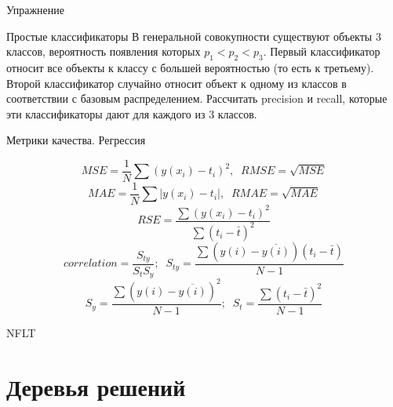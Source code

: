 \documentclass[10pt]{beamer}
\begin{document}

\begin{frame}{Упражнение}

\begin{exampleblock}{Простые классификаторы}
В генеральной совокупности существуют объекты 3 классов, вероятность появления которых $p_1 < p_2 < p_3$. Первый классификатор относит все объекты к классу с большей вероятностью (то есть к третьему). Второй классификатор случайно относит объект к одному из классов в соответствии с базовым распределением. Рассчитать precision и recall, которые эти классификаторы дают для каждого из 3 классов.
\end{exampleblock}

\end{frame}


\begin{frame}{Метрики качества. Регрессия}

\[
MSE = \frac 1 N \sum (y(x_i) - t_i)^2, \;\; RMSE = \sqrt{MSE}
\]
\[
MAE =  \frac 1 N \sum |y(x_i) - t_i|, \;\; RMAE = \sqrt{MAE}
\]
\[
RSE =  \frac{\sum (y(x_i) - t_i)^2}{\sum (t_i - \bar{t})^2}
\]
\[
correlation = \frac{S_{ty}}{S_t S_y};\;\; S_{ty} = \frac{\sum(y(i)-\overline{y(i)})(t_i - \bar t)}{N-1}
\]
\[
S_{y} = \frac{\sum(y(i)-\overline{y(i)})^2}{N-1};\;\;S_{t} = \frac{\sum(t_i - \bar t)^2}{N-1}
\]

\end{frame}

\begin{frame}{NFLT}

\end{frame}

\section{Деревья решений}
\end{document}
